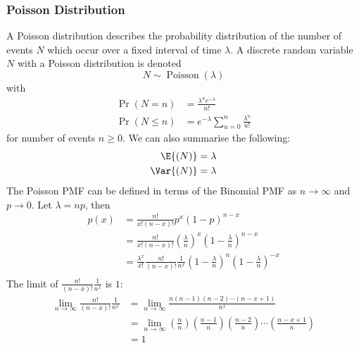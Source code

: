 \documentclass{article}
\begin{document}
\subsubsection{Poisson Distribution}
A Poisson distribution describes the probability distribution of the
number of events \(N\) which occur over a fixed interval of time
\(\lambda\). A discrete random variable \(N\) with a Poisson
distribution is denoted
\begin{equation*}
    N \sim \operatorname{Poisson}{\left( \lambda \right)}
\end{equation*}
with
\begin{align*}
    \Pr{\left( N = n \right)}    & = \frac{\lambda^n e^{-\lambda}}{n!}                \\
    \Pr{\left( N \leq n \right)} & = e^{-\lambda} \sum_{u = 0}^n \frac{\lambda^u}{u!}
\end{align*}
for number of events \(n \geq 0\).
We can also summarise the following:
\begin{align*}
    \E{\left( N \right)}   & = \lambda \\
    \Var{\left( N \right)} & = \lambda
\end{align*}
The Poisson PMF can be defined in terms of the Binomial PMF as
\(n \to \infty\) and \(p \to 0\). Let \(\lambda = np\), then
\begin{align*}
    p\left( x \right) & = \frac{n!}{x! \left( n - x \right)!} p^x \left( 1 - p \right)^{n - x}                                                                                 \\
                      & = \frac{n!}{x! \left( n - x \right)!} \left( \frac{\lambda}{n} \right)^x \left( 1 - \frac{\lambda}{n} \right)^{n - x}                                  \\
                      & = \frac{\lambda^x}{x!} \frac{n!}{\left( n - x \right)!} \frac{1}{n^x} \left( 1 - \frac{\lambda}{n} \right)^n \left( 1 - \frac{\lambda}{n} \right)^{-x} \\
\end{align*}
The limit of \(\frac{n!}{\left( n - x \right)!} \frac{1}{n^x}\) is \(1\):
\begin{align*}
    \lim_{n \to \infty} \frac{n!}{\left( n - x \right)!} \frac{1}{n^x} & = \lim_{n \to \infty} \frac{n\left( n - 1 \right) \left( n - 2 \right) \cdots \left( n - x + 1 \right)}{n^x}                                            \\
                                                                       & = \lim_{n \to \infty} \left( \frac{n}{n} \right)\left( \frac{n - 1}{n} \right) \left( \frac{n - 2}{n} \right) \cdots \left( \frac{n - x + 1}{n} \right) \\
                                                                       & = 1
\end{align*}
\end{document}
